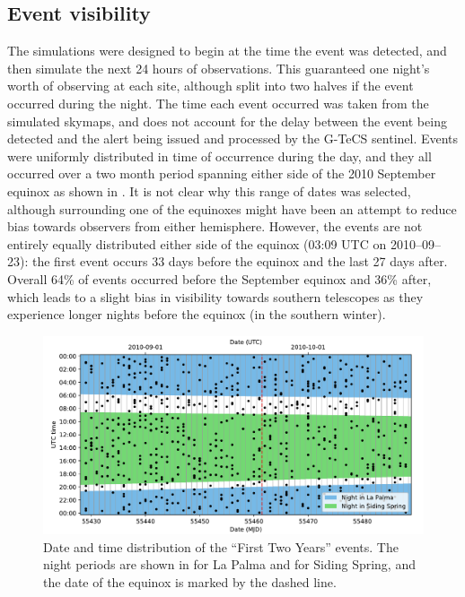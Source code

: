 \subsection{Event visibility}
\label{sec:gw_visability}
\begin{colsection}

The simulations were designed to begin at the time the event was detected, and then simulate the next 24 hours of observations. This guaranteed one night's worth of observing at each site, although split into two halves if the event occurred during the night. The time each event occurred was taken from the simulated skymaps, and does not account for the delay between the event being detected and the alert being issued and processed by the G-TeCS sentinel. Events were uniformly distributed in time of occurrence during the day, and they all occurred over a two month period spanning either side of the 2010 September equinox as shown in . It is not clear why this range of dates was selected, although surrounding one of the equinoxes might have been an attempt to reduce bias towards observers from either hemisphere. However, the events are not entirely equally distributed either side of the equinox (03:09 UTC on 2010--09--23): the first event occurs 33 days before the equinox and the last 27 days after. Overall 64\% of events occurred before the September equinox and 36\% after, which leads to a slight bias in visibility towards southern telescopes as they experience longer nights before the equinox (in the southern winter).

\begin{figure}[t]
    \begin{center}
        \includegraphics[width=\linewidth]{images/f2y_times.pdf}
    \end{center}
    \caption[Date and time distribution of events in the First Two Years sample]{
        Date and time distribution of the ``First Two Years'' events. The night periods are shown in  for La Palma and  for Siding Spring, and the date of the equinox is marked by the  dashed line.
    }\label{fig:f2y_times}
\end{figure}


\end{colsection}
